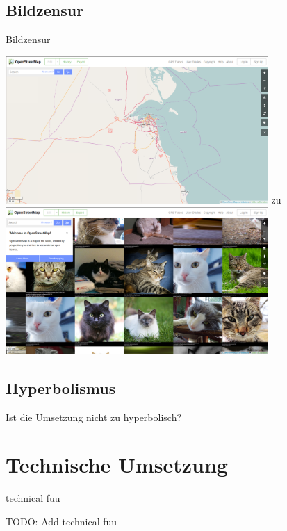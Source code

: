 \documentclass [xcolor=dvipsnames] {beamer}
\begin{document}
\subsection{Bildzensur}
\begin{frame}
	{\sc Bildzensur}
	\begin{center}
		{
			\includegraphics[width=10cm]{osm-1}
		}
		\only<2>
		{
			{\Large zu}
		}
		\only<3>
		{
			\includegraphics[width=10cm]{osm-mod-1}
		}
	\end{center}
\end{frame}

\subsection{Hyperbolismus}
\begin{frame}
	\begin{center}
		{\Large Ist die Umsetzung nicht zu hyperbolisch?}
	\end{center}
\end{frame}

\section{Technische Umsetzung}
\begin{frame}
	{\sc technical fuu}
\end{frame}
\note
{
	{\Large TODO: Add technical fuu}
}
\end{document}
